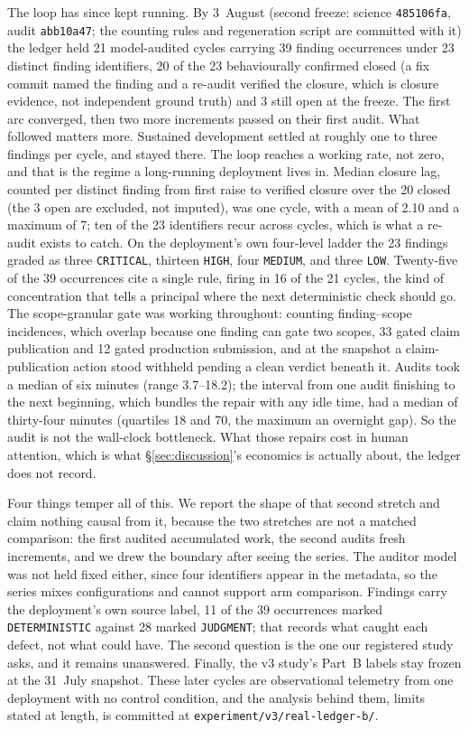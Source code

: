 \documentclass[11pt]{article}
\begin{document}
The loop has since kept running. By 3~August (second freeze: science \texttt{485106fa}, audit \texttt{abb10a47}; the counting rules and regeneration script are committed with it) the ledger held 21 model-audited cycles carrying 39 finding occurrences under 23 distinct finding identifiers, 20 of the 23 behaviourally confirmed closed (a fix commit named the finding and a re-audit verified the closure, which is closure evidence, not independent ground truth) and 3 still open at the freeze. The first arc converged, then two more increments passed on their first audit. What followed matters more. Sustained development settled at roughly one to three findings per cycle, and stayed there. The loop reaches a working rate, not zero, and that is the regime a long-running deployment lives in. Median closure lag, counted per distinct finding from first raise to verified closure over the 20 closed (the 3 open are excluded, not imputed), was one cycle, with a mean of 2.10 and a maximum of 7; ten of the 23 identifiers recur across cycles, which is what a re-audit exists to catch. On the deployment's own four-level ladder the 23 findings graded as three \texttt{CRITICAL}, thirteen \texttt{HIGH}, four \texttt{MEDIUM}, and three \texttt{LOW}. Twenty-five of the 39 occurrences cite a single rule, firing in 16 of the 21 cycles, the kind of concentration that tells a principal where the next deterministic check should go. The scope-granular gate was working throughout: counting finding--scope incidences, which overlap because one finding can gate two scopes, 33 gated claim publication and 12 gated production submission, and at the snapshot a claim-publication action stood withheld pending a clean verdict beneath it. Audits took a median of six minutes (range 3.7--18.2); the interval from one audit finishing to the next beginning, which bundles the repair with any idle time, had a median of thirty-four minutes (quartiles 18 and 70, the maximum an overnight gap). So the audit is not the wall-clock bottleneck. What those repairs cost in human attention, which is what \S\ref{sec:discussion}'s economics is actually about, the ledger does not record.

Four things temper all of this. We report the shape of that second stretch and claim nothing causal from it, because the two stretches are not a matched comparison: the first audited accumulated work, the second audits fresh increments, and we drew the boundary after seeing the series. The auditor model was not held fixed either, since four identifiers appear in the metadata, so the series mixes configurations and cannot support arm comparison. Findings carry the deployment's own source label, 11 of the 39 occurrences marked \texttt{DETERMINISTIC} against 28 marked \texttt{JUDGMENT}; that records what caught each defect, not what could have. The second question is the one our registered study asks, and it remains unanswered. Finally, the v3 study's Part~B labels stay frozen at the 31~July snapshot. These later cycles are observational telemetry from one deployment with no control condition, and the analysis behind them, limits stated at length, is committed at \texttt{experiment/v3/real-ledger-b/}.
\end{document}
